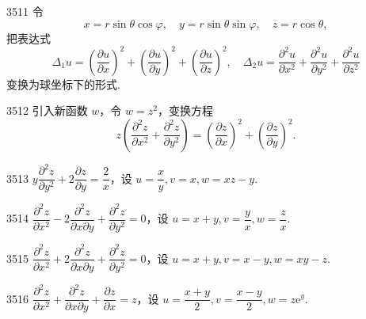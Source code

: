 \begin{prob}[M]{3511}
令
\[
x = r\sin\theta\cos\varphi, \quad y = r\sin\theta\sin\varphi, \quad z = r\cos\theta,
\]
把表达式
\[
\Delta_1 u = \left(\frac{\partial u}{\partial x}\right)^2 + \left(\frac{\partial u}{\partial y}\right)^2 + \left(\frac{\partial u}{\partial z}\right)^2, \quad \Delta_2 u = \frac{\partial^2 u}{\partial x^2} + \frac{\partial^2 u}{\partial y^2} + \frac{\partial^2 u}{\partial z^2}
\]
变换为球坐标下的形式.
\end{prob}

\begin{prob}[M]{3512}
引入新函数 $w$，令 $w = z^2$，变换方程
\[
z\left(\frac{\partial^2 z}{\partial x^2} + \frac{\partial^2 z}{\partial y^2}\right) = \left(\frac{\partial z}{\partial x}\right)^2 + \left(\frac{\partial z}{\partial y}\right)^2.
\]
\end{prob}


\begin{prob}[S]{3513}
$y\dfrac{\partial^2 z}{\partial y^2} + 2\dfrac{\partial z}{\partial y} = \dfrac{2}{x}$，设 $u = \dfrac{x}{y}, v = x, w = xz - y$.
\end{prob}

\begin{prob}[S]{3514}
$\dfrac{\partial^2 z}{\partial x^2} - 2\dfrac{\partial^2 z}{\partial x\partial y} + \dfrac{\partial^2 z}{\partial y^2} = 0$，设 $u = x + y, v = \dfrac{y}{x}, w = \dfrac{z}{x}$.
\end{prob}

\begin{prob}[S]{3515}
$\dfrac{\partial^2 z}{\partial x^2} + 2\dfrac{\partial^2 z}{\partial x\partial y} + \dfrac{\partial^2 z}{\partial y^2} = 0$，设 $u = x + y, v = x - y, w = xy - z$.
\end{prob}

\begin{prob}[S]{3516}
$\dfrac{\partial^2 z}{\partial x^2} + \dfrac{\partial^2 z}{\partial x\partial y} + \dfrac{\partial z}{\partial x} = z$，设 $u = \dfrac{x+y}{2}, v = \dfrac{x-y}{2}, w = z\mathrm{e}^y$.
\end{prob}

